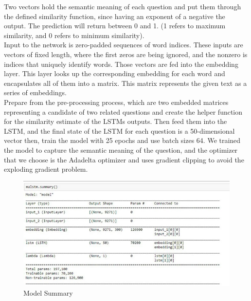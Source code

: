 \documentclass[12pt,oneside,openright,a4paper]{cpe-english-project}
\begin{document}
Two vectors hold the semantic meaning of each question and put them through the defined similarity function, since having an exponent of a negative the output. The prediction will return between 0 and 1. (1 refers to maximum similarity, and 0 refers to minimum similarity).\\
 Input to the network is zero-padded sequences of word indices. These inputs are vectors of fixed length, where the first zeros are being ignored, and the nonzero is indices that uniquely identify words. Those vectors are fed into the embedding layer. This layer looks up the corresponding embedding for each word and encapsulates all of them into a matrix. This matrix represents the given text as a series of embeddings.\\
Prepare from the pre-processing process, which are two embedded matrices representing a candidate of two related questions and create the helper function for the similarity estimate of the LSTMs outputs. Then feed them into the LSTM, and the final state of the LSTM for each question is a 50-dimensional vector then, train the model with 25 epochs and use batch sizes 64. We trained the model to capture the semantic meaning of the question, and the optimizer that we choose is the Adadelta optimizer and uses gradient clipping to avoid the exploding gradient problem.

\begin{figure}[!h]
	\includegraphics[width=14cm]{img/ch3/Model summary.jpg}
	\caption{Model Summary}\label{fig:Model Summary}
\end{figure}

\pagebreak
\end{document}
